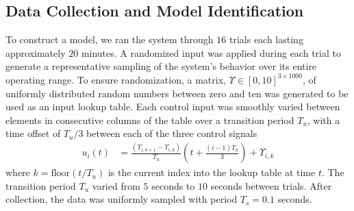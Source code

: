 \subsection{Data Collection and Model Identification}
\label{sec:datacollection}

To construct a model, we ran the system through $16$ trials each lasting approximately $20$ minutes.
A randomized input was applied during each trial to generate a representative sampling of the system's behavior over its entire operating range.
To ensure randomization, a matrix, $\Upsilon \in [0,10]^{3\times 1000}$, of uniformly distributed random numbers between zero and ten was generated to be used as an input lookup table.
Each control input was smoothly varied between elements in consecutive columns of the table over a transition period $T_u$, with a time offset of $T_u / 3$ between each of the three control signals
\begin{align}
    u_i (t) &= \frac{(\Upsilon_{i,k+1} - \Upsilon_{i,k})}{T_u} \left( t + \frac{(i-1) T_u}{3} \right) + \Upsilon_{i,k}
    \label{eq:input}
\end{align}
where $k = \text{floor}\left( {t} / {T_u} \right)$ is the current index into the lookup table at time $t$. 
The transition period $T_u$ varied from $5$ seconds to $10$ seconds between trials.
After collection, the data was uniformly sampled with period $T_s = 0.1$ seconds.

